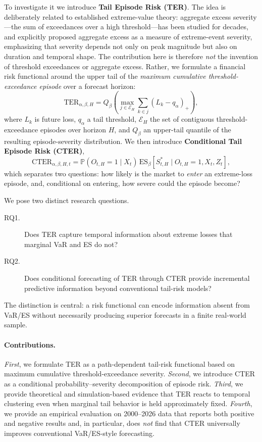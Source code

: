 \documentclass[11pt]{article}
\newcommand{\Prob}{\mathbb{P}}
\newcommand{\ES}{\mathrm{ES}}
\newcommand{\TER}{\mathrm{TER}}
\newcommand{\CTER}{\mathrm{CTER}}
\begin{document}
To investigate it we introduce \textbf{Tail Episode Risk (TER)}. The idea is deliberately related to
established extreme-value theory: aggregate excess severity---the sum of exceedances over a high
threshold---has been studied for decades, and \citet{anderson1994} explicitly proposed aggregate excess as
a measure of extreme-event severity, emphasizing that severity depends not only on peak magnitude but also
on duration and temporal shape. The contribution here is therefore \emph{not} the invention of threshold
exceedances or aggregate excess. Rather, we formulate a financial risk functional around the upper tail of
the \emph{maximum cumulative threshold-exceedance episode} over a forecast horizon:
\[
\TER_{\alpha,\beta,H}
= Q_{\beta}\!\left( \max_{j\in\mathcal E_{H}} \sum_{k\in j}(L_k-q_\alpha)_+ \right),
\]
where $L_k$ is future loss, $q_\alpha$ a tail threshold, $\mathcal E_H$ the set of contiguous
threshold-exceedance episodes over horizon $H$, and $Q_\beta$ an upper-tail quantile of the resulting
episode-severity distribution. We then introduce \textbf{Conditional Tail Episode Risk (CTER)},
\[
\CTER_{\alpha,\beta,H,t}
= \Prob\!\left(O_{t,H}=1 \mid X_t\right)\,
  \ES_\beta\!\left[ S^{*}_{t,H} \mid O_{t,H}=1, X_t, Z_t \right],
\]
which separates two questions: how likely is the market to \emph{enter} an extreme-loss episode, and,
conditional on entering, how severe could the episode become?

We pose two distinct research questions.
\begin{description}
\item[RQ1.] Does TER capture temporal information about extreme losses that marginal VaR and ES do not?
\item[RQ2.] Does conditional forecasting of TER through CTER provide incremental predictive information
beyond conventional tail-risk models?
\end{description}
The distinction is central: a risk functional can encode information absent from VaR/ES without
necessarily producing superior forecasts in a finite real-world sample.

\paragraph{Contributions.} \emph{First}, we formulate TER as a path-dependent tail-risk functional based
on maximum cumulative threshold-exceedance severity. \emph{Second}, we introduce CTER as a conditional
probability--severity decomposition of episode risk. \emph{Third}, we provide theoretical and
simulation-based evidence that TER reacts to temporal clustering even when marginal tail behavior is held
approximately fixed. \emph{Fourth}, we provide an empirical evaluation on 2000--2026 data that reports both
positive and negative results and, in particular, does \emph{not} find that CTER universally improves
conventional VaR/ES-style forecasting.
\end{document}
